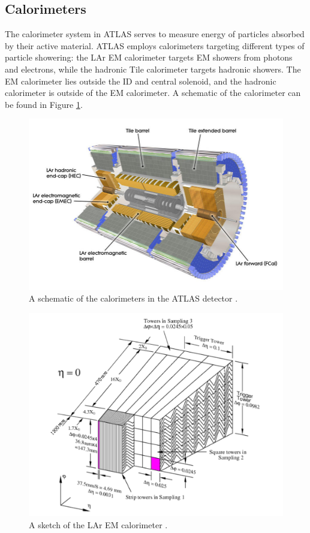 \subsection{Calorimeters}
The calorimeter system in ATLAS serves to measure energy of particles absorbed by their active material. ATLAS employs calorimeters targeting different types of particle showering: the \gls{LAr} \gls{EM} calorimeter targets \gls{EM} showers from photons and electrons, while the hadronic Tile calorimeter targets hadronic showers. The \gls{EM} calorimeter lies outside the \gls{ID} and central solenoid, and the hadronic calorimeter is outside of the \gls{EM} calorimeter.  A schematic of the calorimeter can be found in Figure \ref{fig:calorimeter}.


\begin{figure}
    \centering
    \includegraphics[width=.7\textwidth]{chapters/chapter2_experiment/images/calorimeter.jpeg}
    \caption{A schematic of the calorimeters in the ATLAS detector \cite{atlas-experiment}.}
    \label{fig:calorimeter}
\end{figure}

\begin{figure}
    \centering
    \includegraphics[width=.9\textwidth]{chapters/chapter2_experiment/images/lar.png}
    \caption{A sketch of the \gls{LAr} \gls{EM} calorimeter \cite{lar-tdr}.}
    \label{fig:lar}
\end{figure}

